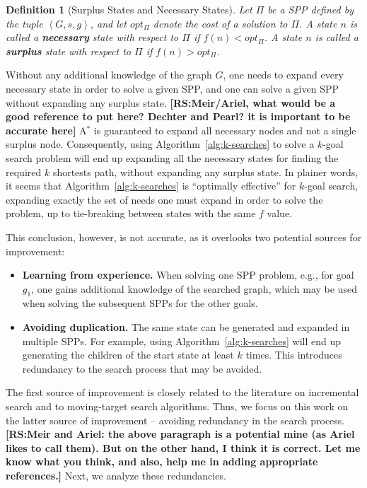 \documentclass{aicom2e}
\newtheorem{definition}{Definition}
\newcommand{\kgs}{$k$-goal search}
\newcommand{\astar}{A$^*$}
\newcommand{\tuple}[1]{\ensuremath{\left \langle #1 \right \rangle }}
\newcommand{\roni}[1]{\textbf{[RS:#1]}}
\begin{document}
\begin{definition}[Surplus States and Necessary States]
	Let $\Pi$ be a SPP defined by the tuple $\tuple{G,s,g}$, and let $opt_\Pi$ denote the cost of a solution to $\Pi$. 
	A state $n$ is called a {\bf necessary} state with respect to $\Pi$ if $f(n)<opt_\Pi$. 
	A state $n$ is called a {\bf surplus} state with respect to $\Pi$ if $f(n)>opt_\Pi$. 
\label{def:surplus}
\end{definition}
Without any additional knowledge of the graph $G$, one needs to expand every necessary state in order to solve a given SPP, 
and one can solve a given SPP without expanding any surplus state. \roni{Meir/Ariel, what would be a good reference to put here? Dechter and Pearl? it is important to be accurate here}
\astar{} is guaranteed to expand all necessary nodes and not a single surplus node. Consequently, 
using Algorithm~\ref{alg:k-searches} to solve a \kgs{} problem will end up expanding all the necessary states 
for finding the required $k$ shortests path, without expanding any surplus state. 
In plainer words, it seems that Algorithm~\ref{alg:k-searches} is ``optimally effective'' for \kgs{}, 
expanding exactly the set of needs one must expand in order to solve the problem, up to tie-breaking between states with the same $f$ value. 


This conclusion, however, is not accurate, as it overlooks two potential sources for improvement:
\begin{itemize}
	\item {\bf Learning from experience.} When solving one SPP problem, e.g., for goal $g_1$, one gains additional knowledge of the searched graph, which may be used when solving the subsequent SPPs for the other goals.
	\item {\bf Avoiding duplication.} The same state can be generated and expanded in multiple SPPs. For example, using Algorithm~\ref{alg:k-searches} will end up generating the children of the start state at least $k$ times. This introduces redundancy to the search process that may be avoided.  
\end{itemize}
The first source of improvement is closely related to the literature on incremental search and to moving-target search algorithms. Thus, we focus on this work on the latter source of improvement -- avoiding redundancy in the search process. 
\roni{Meir and Ariel: the above paragraph is a potential mine (as Ariel likes to call them). But on the other hand, I think it is correct. Let me know what you think, and also, help me in adding appropriate references.}
Next, we analyze these redundancies. 
\end{document}
